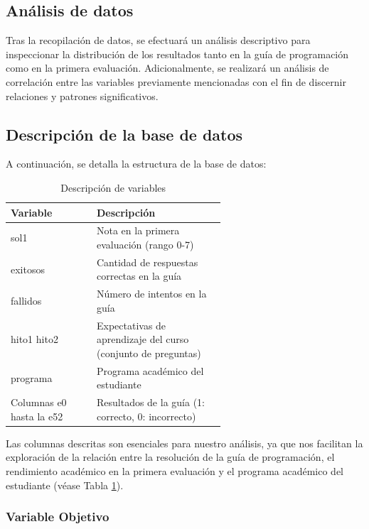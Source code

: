 \subsection{Análisis de datos}

Tras la recopilación de datos, se efectuará un análisis descriptivo para inspeccionar la distribución de los resultados tanto en la guía de programación como en la primera evaluación. Adicionalmente, se realizará un análisis de correlación entre las variables previamente mencionadas con el fin de discernir relaciones y patrones significativos.

\subsection{Descripción de la base de datos}

A continuación, se detalla la estructura de la base de datos:

\begin{table}[H]
    \centering
    \caption{Descripción de variables}
    \begin{tabular}{lp{0.6\linewidth}}
        \toprule
        \textbf{Variable} & \textbf{Descripción} \\
        \midrule
        sol1 & Nota en la primera evaluación (rango 0-7) \\
        exitosos & Cantidad de respuestas correctas en la guía \\
        fallidos & Número de intentos en la guía \\
        hito1 hito2 & Expectativas de aprendizaje del curso (conjunto de preguntas) \\
        programa & Programa académico del estudiante \\
        Columnas e0 hasta la e52 & Resultados de la guía (1: correcto, 0: incorrecto) \\
        \bottomrule
    \end{tabular}
    \label{tab:variables}
\end{table}

Las columnas descritas son esenciales para nuestro análisis, ya que nos facilitan la exploración de la relación entre la resolución de la guía de programación, el rendimiento académico en la primera evaluación y el programa académico del estudiante (véase Tabla \ref{tab:variables}).

\subsubsection{Variable Objetivo}

